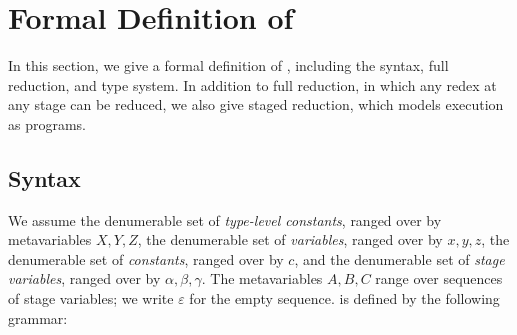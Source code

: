 
\section{Formal Definition of \LMD \label{sec:formal-definition}}
\label{sec:formal}

In this section, we give a formal definition of \LMD, including
the syntax, full reduction, and type system.  In addition to full reduction,
in which any redex at any stage can be reduced, we also give staged reduction,
which models execution as programs.

\subsection{Syntax}

We assume the denumerable set of \emph{type-level constants}, ranged over by
metavariables \(X, Y, Z\), the denumerable set of \emph{variables}, ranged
over by \(x,y,z\), the denumerable set of \emph{constants}, ranged over by
\(c\), and the denumerable set of \emph{stage variables}, ranged over by
\(\alpha, \beta, \gamma\).  The metavariables \(A, B, C\) range over
sequences of stage variables; we write \(\varepsilon\) for the empty
sequence. \LMD is defined by the following grammar:

